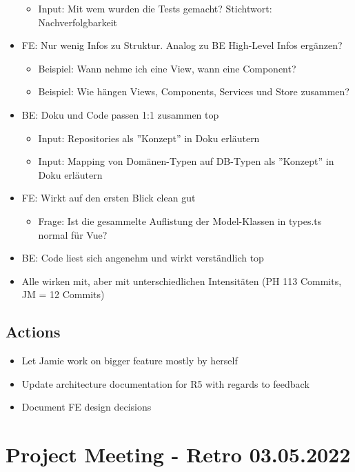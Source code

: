 \begin{itemize}
    \begin{itemize}
        \item Input: Mit wem wurden die Tests gemacht? Stichtwort: Nachverfolgbarkeit
    \end{itemize}
    \item FE: Nur wenig Infos zu Struktur. Analog zu BE High-Level Infos ergänzen?
    \begin{itemize}
        \item Beispiel: Wann nehme ich eine View, wann eine Component?
        \item Beispiel: Wie hängen Views, Components, Services und Store zusammen?
    \end{itemize}
    \item BE: Doku und Code passen 1:1 zusammen \textrightarrow top
    \begin{itemize}
        \item Input: Repositories als ''Konzept'' in Doku erläutern
        \item Input: Mapping von Domänen-Typen auf DB-Typen als ''Konzept'' in Doku erläutern
    \end{itemize}
    \item FE: Wirkt auf den ersten Blick clean \textrightarrow gut
    \begin{itemize}
        \item Frage: Ist die gesammelte Auflistung der Model-Klassen in types.ts normal für Vue?
    \end{itemize}
    \item BE: Code liest sich angenehm und wirkt verständlich \textrightarrow top
    \item Alle wirken mit, aber mit unterschiedlichen Intensitäten (PH 113 Commits, JM = 12 Commits)
\end{itemize}

\subsection{Actions}

\begin{itemize}
    \item Let Jamie work on bigger feature mostly by herself
    \item Update architecture documentation for R5 with regards to feedback
    \item Document FE design decisions
\end{itemize}


\section{Project Meeting - Retro 03.05.2022}

